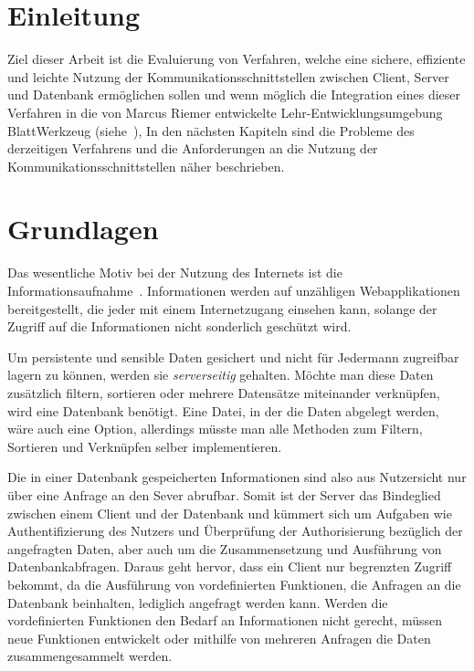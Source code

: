 
\chapter{Einleitung}
\label{sec:requirements}

Ziel dieser Arbeit ist die Evaluierung von Verfahren, welche eine sichere, effiziente und leichte Nutzung der Kommunikationsschnittstellen 
zwischen Client, Server und Datenbank ermöglichen sollen und wenn möglich die Integration eines dieser Verfahren
in die von Marcus Riemer entwickelte Lehr-Entwicklungsumgebung BlattWerkzeug (siehe~),
In den nächsten Kapiteln sind die Probleme des derzeitigen Verfahrens und die Anforderungen an die Nutzung der Kommunikationsschnittstellen näher beschrieben.

\chapter{Grundlagen}
\label{sec:basics}
Das wesentliche Motiv bei der Nutzung des Internets ist die In\-for\-ma\-tions\-auf\-nah\-me~\cite{statista-1}\cite{ard-zdf}.
Informationen werden auf unzähligen Webapplikationen bereitgestellt, die jeder mit einem Internetzugang einsehen kann,
solange der Zugriff auf die Informationen nicht sonderlich geschützt wird.

Um persistente und sensible Daten gesichert und nicht für Jedermann zugreifbar lagern zu können, werden sie \emph{serverseitig} gehalten.
Möchte man diese Daten zusätzlich filtern, sortieren oder mehrere Datensätze miteinander verknüpfen, wird eine Datenbank benötigt.
Eine Datei, in der die Daten abgelegt werden, wäre auch eine Option, allerdings müsste man alle Methoden zum Filtern, Sortieren und Verknüpfen
selber implementieren.

Die in einer Datenbank gespeicherten Informationen sind also aus Nutzersicht nur über eine Anfrage an den Sever abrufbar.
Somit ist der Server das Bindeglied zwischen einem Client und der Datenbank und kümmert sich um Aufgaben wie Authentifizierung des Nutzers
und Überprüfung der Authorisierung bezüglich der angefragten Daten, aber auch um die Zusammensetzung und Ausführung von Datenbankabfragen.
Daraus geht hervor, dass ein Client nur begrenzten Zugriff bekommt, da die Ausführung von vordefinierten Funktionen, die Anfragen an die Datenbank beinhalten,
lediglich angefragt werden kann. Werden die vordefinierten Funktionen den Bedarf an Informationen nicht gerecht, müssen neue Funktionen entwickelt
oder mithilfe von mehreren Anfragen die Daten zusammengesammelt werden.

